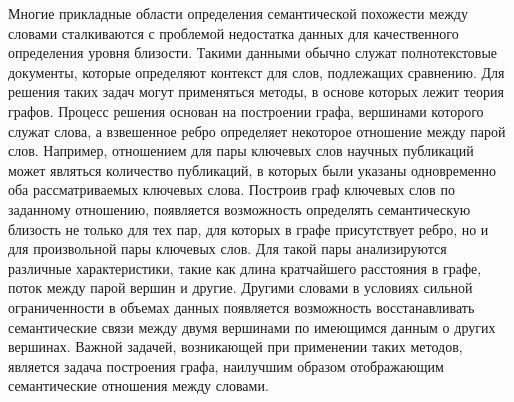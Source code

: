 Многие прикладные области определения семантической похожести между словами сталкиваются с проблемой недостатка данных для качественного определения уровня близости. Такими данными обычно служат полнотекстовые документы, которые определяют контекст для слов, подлежащих сравнению. Для решения таких задач могут применяться методы, в основе которых лежит теория графов. Процесс решения основан на построении графа, вершинами которого служат слова, а взвешенное ребро определяет некоторое отношение между парой слов. Например, отношением для пары ключевых слов научных публикаций может являться количество публикаций, в которых были указаны одновременно оба рассматриваемых ключевых слова. Построив граф ключевых слов по заданному отношению, появляется возможность определять семантическую близость не только для тех пар, для которых в графе присутствует ребро, но и для произвольной пары ключевых слов. Для такой пары анализируются различные характеристики, такие как длина кратчайшего расстояния в графе, поток между парой вершин и другие. Другими словами в условиях сильной ограниченности в объемах данных появляется возможность восстанавливать семантические связи между двумя вершинами по имеющимся данным о других вершинах. Важной задачей, возникающей при применении таких методов, является задача построения графа, наилучшим образом отображающим семантические отношения между словами.


